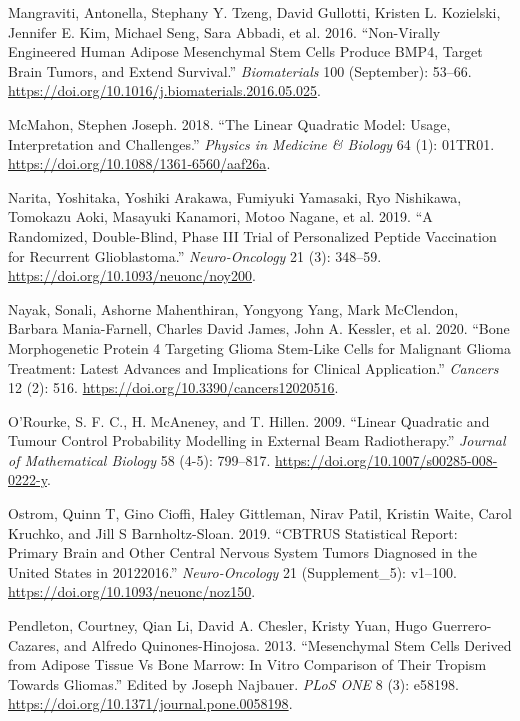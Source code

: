 \documentclass[
  default,
]{sn-jnl}
\newlength{\cslhangindent}
\newenvironment{CSLReferences}[2] %
 {\begin{list}{}{%
  \setlength{\itemindent}{0pt}
  \setlength{\leftmargin}{0pt}
  \setlength{\parsep}{0pt}
  \ifodd #1
   \setlength{\leftmargin}{\cslhangindent}
   \setlength{\itemindent}{-1\cslhangindent}
  \fi
  \setlength{\itemsep}{#2\baselineskip}}}
 {\end{list}}
\begin{document}
\begin{CSLReferences}{1}{0}
Mangraviti, Antonella, Stephany Y. Tzeng, David Gullotti, Kristen L.
Kozielski, Jennifer E. Kim, Michael Seng, Sara Abbadi, et al. 2016.
{``Non-Virally Engineered Human Adipose Mesenchymal Stem Cells Produce
BMP4, Target Brain Tumors, and Extend Survival.''} \emph{Biomaterials}
100 (September): 53--66.
\url{https://doi.org/10.1016/j.biomaterials.2016.05.025}.

McMahon, Stephen Joseph. 2018. {``The Linear Quadratic Model: Usage,
Interpretation and Challenges.''} \emph{Physics in Medicine \& Biology}
64 (1): 01TR01. \url{https://doi.org/10.1088/1361-6560/aaf26a}.

Narita, Yoshitaka, Yoshiki Arakawa, Fumiyuki Yamasaki, Ryo Nishikawa,
Tomokazu Aoki, Masayuki Kanamori, Motoo Nagane, et al. 2019. {``A
Randomized, Double-Blind, Phase III Trial of Personalized Peptide
Vaccination for Recurrent Glioblastoma.''} \emph{Neuro-Oncology} 21 (3):
348--59. \url{https://doi.org/10.1093/neuonc/noy200}.

Nayak, Sonali, Ashorne Mahenthiran, Yongyong Yang, Mark McClendon,
Barbara Mania-Farnell, Charles David James, John A. Kessler, et al.
2020. {``Bone Morphogenetic Protein 4 Targeting Glioma Stem-Like Cells
for Malignant Glioma Treatment: Latest Advances and Implications for
Clinical Application.''} \emph{Cancers} 12 (2): 516.
\url{https://doi.org/10.3390/cancers12020516}.

O'Rourke, S. F. C., H. McAneney, and T. Hillen. 2009. {``Linear
Quadratic and Tumour Control Probability Modelling in External Beam
Radiotherapy.''} \emph{Journal of Mathematical Biology} 58 (4-5):
799--817. \url{https://doi.org/10.1007/s00285-008-0222-y}.

Ostrom, Quinn T, Gino Cioffi, Haley Gittleman, Nirav Patil, Kristin
Waite, Carol Kruchko, and Jill S Barnholtz-Sloan. 2019. {``CBTRUS
Statistical Report: Primary Brain and Other Central Nervous System
Tumors Diagnosed in the United States in 2012{\textendash}2016.''}
\emph{Neuro-Oncology} 21 (Supplement{\_}5): v1--100.
\url{https://doi.org/10.1093/neuonc/noz150}.

Pendleton, Courtney, Qian Li, David A. Chesler, Kristy Yuan, Hugo
Guerrero-Cazares, and Alfredo Quinones-Hinojosa. 2013. {``Mesenchymal
Stem Cells Derived from Adipose Tissue Vs Bone Marrow: In Vitro
Comparison of Their Tropism Towards Gliomas.''} Edited by Joseph
Najbauer. \emph{PLoS ONE} 8 (3): e58198.
\url{https://doi.org/10.1371/journal.pone.0058198}.


\end{CSLReferences}
\end{document}
